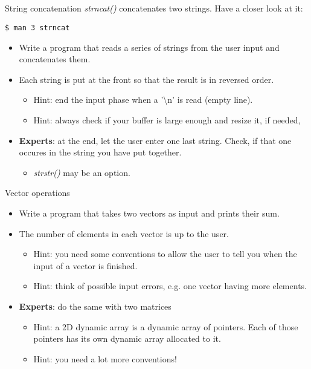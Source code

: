\subsection{}
\begin{frame}[fragile]{String concatenation}
	\textit{strncat()} concatenates two strings. Have a closer look at it:
	\begin{lstlisting}[numbers=none]
$ man 3 strncat
\end{lstlisting}
	\begin{itemize}
		\item Write a program that reads a series of strings from the user input and concatenates them.
		\item Each string is put at the front so that the result is in reversed order.
		\begin{itemize}
			\item<2-> Hint: end the input phase when a '\textbackslash n' is read (empty line).
			\item<3-> Hint: always check if your buffer is large enough and resize it, if needed,
		\end{itemize}
		\item \textbf{Experts}: at the end, let the user enter one last string. Check, if that one occures in the string you have put together.
		\begin{itemize}
			\item<2-> \textit{strstr()} may be an option.
		\end{itemize}
	\end{itemize}		
\end{frame}
\begin{frame}{Vector operations}
	\begin{itemize}
		\item Write a program that takes two vectors as input and prints their sum.
		\item The number of elements in each vector is up to the user.
		\begin{itemize}
			\item<2-> Hint: you need some conventions to allow the user to tell you when the input of a vector is finished.
			\item<3-> Hint: think of possible input errors, e.g. one vector having more elements.
		\end{itemize}
		\item \textbf{Experts}: do the same with two matrices
		\begin{itemize}
			\item<2-> Hint: a 2D dynamic array is a dynamic array of pointers. Each of those pointers has its own dynamic array allocated to it.
			\item<3-> Hint: you need a lot more conventions!
		\end{itemize}
	\end{itemize}
\end{frame}
